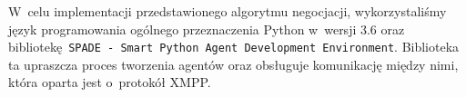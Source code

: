 W~celu implementacji przedstawionego algorytmu negocjacji, wykorzystaliśmy język programowania ogólnego przeznaczenia Python w~wersji 3.6 oraz bibliotekę \texttt{SPADE - Smart Python Agent Development Environment}. Biblioteka ta upraszcza proces tworzenia agentów oraz obsługuje komunikację między nimi, która oparta jest o~protokół XMPP.